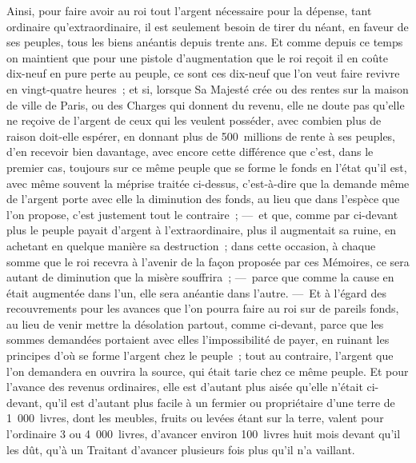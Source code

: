 \documentclass[french,twoside]{book} %
\begin{document}
Ainsi, pour faire avoir au roi tout l’argent nécessaire pour la dépense, tant ordinaire qu’extraordinaire, il est seulement besoin de tirer du néant, en faveur de ses peuples, tous les biens anéantis depuis trente ans. Et comme depuis ce temps on maintient que pour une pistole d’augmentation que le roi reçoit il en coûte dix-neuf en pure perte au peuple, ce sont ces dix-neuf que l’on veut faire revivre en vingt-quatre heures ; et si, lorsque Sa Majesté crée ou des rentes sur la maison de ville de Paris, ou des Charges qui donnent du revenu, elle ne doute pas qu’elle ne reçoive de l’argent de ceux qui les veulent posséder, avec combien plus de raison doit-elle espérer, en donnant plus de 500 millions de rente à ses peuples, d’en recevoir bien davantage, avec encore cette différence que c’est, dans le premier cas, toujours sur ce même peuple que se forme le fonds en l’état qu’il est, avec même souvent la méprise traitée ci-dessus, c’est-à-dire que la demande même de l’argent porte avec elle la diminution des fonds, au lieu que dans l’espèce que l’on propose, c’est justement tout le contraire ; — et que, comme par ci-devant plus le peuple payait d’argent à l’extraordinaire, plus il augmentait sa ruine, en achetant en quelque manière sa destruction ; dans cette occasion, à chaque somme que le roi recevra à l’avenir de la façon proposée par ces Mémoires, ce sera autant de diminution que la misère souffrira ; — parce que comme la cause en était augmentée dans l’un, elle sera anéantie dans l’autre. — Et à l’égard des recouvrements pour les avances que l’on pourra faire au roi sur de pareils fonds, au lieu de venir mettre la désolation partout, comme ci-devant, parce que les sommes demandées portaient avec elles l’impossibilité de payer, en ruinant les principes d’où se forme l’argent chez le peuple ; tout au contraire, l’argent que l’on demandera en ouvrira la source, qui était tarie chez ce même peuple. Et pour l’avance des revenus ordinaires, elle est d’autant plus aisée qu’elle n’était ci-devant, qu’il est d’autant plus facile à un fermier ou propriétaire d’une terre de 1 000 livres, dont les meubles, fruits ou levées étant sur la terre, valent pour l’ordinaire 3 ou 4 000 livres, d’avancer environ 100 livres huit mois devant qu’il les dût, qu’à un Traitant d’avancer plusieurs fois plus qu’il n’a vaillant.\par
\end{document}
